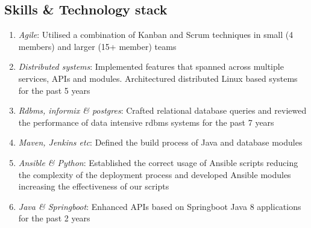 \documentclass{CVSoftwareEngineer}
\begin{document}
\begin{paracol}{2}

		\section{Skills \& Technology stack}
		\begin{enumerate}[leftmargin=*, rightmargin=10pt]
			\item[\textasteriskcentered] \textit{Agile}: Utilised a combination of Kanban and Scrum techniques in small (4 members)
				and larger (15+ member) teams
			\item[\textasteriskcentered] \textit{Distributed systems}: Implemented features that spanned across multiple services,
				APIs and modules. Architectured distributed Linux based systems for the past 5 years
			\item[\textasteriskcentered] \textit{Rdbms, informix \& postgres}: Crafted relational database queries and reviewed
				the performance of data intensive rdbms systems for the past 7 years
			\item[\textasteriskcentered] \textit{Maven, Jenkins etc}: Defined the build process of Java and database modules
			\item[\textasteriskcentered] \textit{Ansible \& Python}: Established the correct usage of Ansible scripts reducing the complexity
				of the deployment process and developed Ansible modules increasing the effectiveness of our scripts
			\item[\textasteriskcentered] \textit{Java \& Springboot}: Enhanced APIs based on Springboot Java 8
				applications for the past 2 years
		\end{enumerate}

	\end{paracol}
\end{document}
